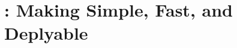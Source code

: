 % 
% 
% 
% 
% 
% 
% 
% 
% 


\chapter{\parrot: Making \smt Simple, Fast, and Deplyable} \label{sec:parrot}











